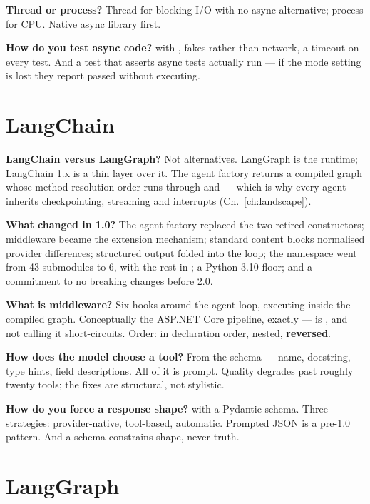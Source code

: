\textbf{Thread or process?} Thread for blocking I/O with no async alternative;
process for CPU. Native async library first.

\textbf{How do you test async code?}  with
, fakes rather than network, a timeout on every
test. And a test that asserts async tests actually run --- if the mode setting is
lost they report passed without executing.

\section{LangChain}
\label{sec:appD-langchain}

\textbf{LangChain versus LangGraph?} Not alternatives. LangGraph is the
runtime; LangChain 1.x is a thin layer over it. The agent factory returns a
compiled graph whose method resolution order runs through  and
 --- which is why every agent inherits checkpointing, streaming
and interrupts (Ch.~\ref{ch:landscape}).

\textbf{What changed in 1.0?} The agent factory replaced the two retired
constructors; middleware became the extension mechanism; standard content blocks
normalised provider differences; structured output folded into the loop; the
namespace went from 43 submodules to 6, with the rest in
; a Python 3.10 floor; and a commitment to no breaking
changes before 2.0.

\textbf{What is middleware?} Six hooks around the agent loop, executing inside
the compiled graph. Conceptually the ASP.NET Core pipeline, exactly ---
 is , and not calling it
short-circuits. Order:  in declaration order, 
nested,  \textbf{reversed}.

\textbf{How does the model choose a tool?} From the schema --- name, docstring,
type hints, field descriptions. All of it is prompt. Quality degrades past
roughly twenty tools; the fixes are structural, not stylistic.

\textbf{How do you force a response shape?}  with a
Pydantic schema. Three strategies: provider-native, tool-based, automatic.
Prompted JSON is a pre-1.0 pattern. And a schema constrains shape, never truth.

\section{LangGraph}
\label{sec:appD-langgraph}

